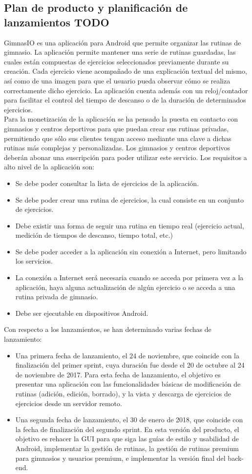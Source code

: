\documentclass[11pt,a4paper]{report}
\begin{document}
\subsection{Plan de producto y planificación de lanzamientos TODO}
GimnasIO es una aplicación para Android que permite organizar las rutinas de gimnasio. La aplicación permite mantener una serie de rutinas guardadas, las cuales están compuestas de ejercicios seleccionados previamente durante su creación. Cada ejercicio viene acompañado de una explicación textual del mismo, así como de una imagen para que el usuario pueda observar cómo se realiza correctamente dicho ejercicio. La aplicación cuenta además con un reloj/contador para facilitar el control del tiempo de descanso o de la duración de determinados ejercicios.
\\Para la monetización de la aplicación se ha pensado la puesta en contacto con gimnasios y centros deportivos para que puedan crear sus rutinas privadas, permitiendo que sólo sus clientes tengan acceso mediante una clave a dichas rutinas más complejas y personalizadas. Los gimnasios y centros deportivos deberán abonar una suscripción para poder utilizar este servicio.
\newline Los requisitos a alto nivel de la aplicación son:
\begin{itemize}
	\item Se debe poder consultar la lista de ejercicios de la aplicación.
	\item Se debe poder crear una rutina de ejercicios, la cual consiste en un conjunto de ejercicios.
	\item Debe existir una forma de seguir una rutina en tiempo real (ejercicio actual, medición de tiempos de
	descanso, tiempo total, etc.)
	\item Se debe poder acceder a la aplicación sin conexión a Internet, pero limitando los servicios.
	\item La conexión a Internet será necesaria cuando se acceda por primera vez a la aplicación, haya alguna
	actualización de algún ejercicio o se acceda a una rutina privada de gimnasio.	
	\item Debe ser ejecutable en dispositivos Android.
\end{itemize}
Con respecto a los lanzamientos, se han determinado varias fechas de lanzamiento:
\begin{itemize}
	\item Una primera fecha de lanzamiento, el 24 de noviembre, que coincide con la finalización del primer sprint, cuya duración fue desde el 20 de octubre al 24 de noviembre de 2017. Para esta fecha de lanzamiento, el objetivo es presentar una aplicación con las funcionalidades básicas de modificación de rutinas (adición, edición, borrado), y la  vista y descarga de ejercicios de ejercicios desde un servidor remoto.
	\item Una segunda fecha de lanzamiento, el 30 de enero de 2018,  que coincide con la fecha de finalización del segundo sprint. En esta versión del producto, el objetivo es rehacer la GUI para que siga las guías de estilo y usabilidad de Android, implementar la gestión de rutinas, la gestión de rutinas premium para gimnasios y usuarios premium, e implementar la versión final del back-end.
\end{itemize}
\end{document}
